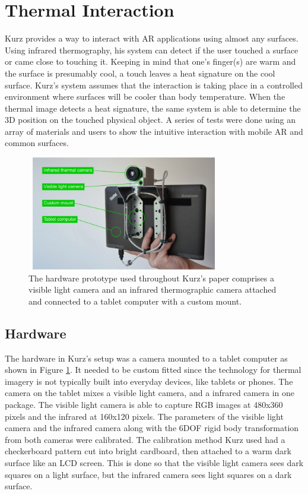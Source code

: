 \documentclass{sig-alternate}
\begin{document}
\section{Thermal Interaction}
\label{sec:Thermal Interaction}
Kurz \cite{Thermal} provides a way to interact with AR applications using almost any surfaces. Using infrared thermography, his system can detect if the user touched a surface or came close to touching it. Keeping in mind that one's finger(s) are warm and the surface is presumably cool, a touch leaves a heat signature on the cool surface. Kurz's system assumes that the interaction is taking place in a controlled environment where surfaces will be cooler than body temperature. When the thermal image detects a heat signature, the same system is able to determine the 3D position on the touched physical object. A series of tests were done using an array of materials and users to show the intuitive interaction with mobile AR and common surfaces. 

\begin{figure}
	\includegraphics[width=8.5cm, height=5cm]{Hardware2}
	\caption{The hardware prototype used throughout Kurz's paper comprises a visible light camera and an infrared thermographic camera attached and connected to a tablet computer with a custom mount. \cite{Thermal}}
	\label{fig:hardware}
\end{figure}

\subsection{Hardware}
\label{Hardware}
The hardware in Kurz's \cite{Thermal} setup was a camera mounted to a tablet computer as shown in Figure \ref{fig:hardware}. It needed to be custom fitted since the technology for thermal imagery is not typically built into everyday devices, like tablets or phones. The camera on the tablet mixes a visible light camera, and a infrared camera in one package. The visible light camera is able to capture RGB images at 480x360 pixels and the infrared at 160x120 pixels. The parameters of the visible light camera and the infrared camera along with the 6DOF rigid body transformation from both cameras were calibrated. The calibration method Kurz used had a checkerboard pattern cut into bright cardboard, then attached to a warm dark surface like an LCD screen. This is done so that the visible light camera sees dark squares on a light surface, but the infrared camera sees light squares on a dark surface.
\end{document}
